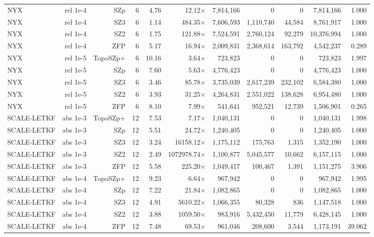 \begin{tabular}{lrrrrrrrrrr}
NYX & rel 1e-4 & SZp & 6 & 4.76 & 12.12$\times$ & 7,814,166 & 0 & 0 & 7,814,166 & 1.000 \\
NYX & rel 1e-4 & SZ3 & 6 & 1.14 & 484.35$\times$ & 7,606,593 & 1,110,740 & 44,584 & 8,761,917 & 1.000 \\
NYX & rel 1e-4 & SZ2 & 6 & 1.75 & 121.88$\times$ & 7,524,591 & 2,760,124 & 92,279 & 10,376,994 & 1.000 \\
NYX & rel 1e-4 & ZFP & 6 & 5.17 & 16.94$\times$ & 2,009,831 & 2,368,614 & 163,792 & 4,542,237 & 0.289 \\
NYX & rel 1e-5 & TopoSZp+ & 6 & 10.16 & 3.64$\times$ & 723,823 & 0 & 0 & 723,823 & 1.997 \\
NYX & rel 1e-5 & SZp & 6 & 7.60 & 5.63$\times$ & 4,776,423 & 0 & 0 & 4,776,423 & 1.000 \\
NYX & rel 1e-5 & SZ3 & 6 & 3.46 & 85.78$\times$ & 3,735,039 & 2,617,239 & 232,102 & 6,584,380 & 1.000 \\
NYX & rel 1e-5 & SZ2 & 6 & 3.93 & 31.25$\times$ & 4,264,831 & 2,551,022 & 138,628 & 6,954,480 & 1.000 \\
NYX & rel 1e-5 & ZFP & 6 & 8.10 & 7.99$\times$ & 541,641 & 952,521 & 12,739 & 1,506,901 & 0.265 \\
SCALE-LETKF & abs 1e-3 & TopoSZp+ & 12 & 7.53 & 7.17$\times$ & 1,040,131 & 0 & 0 & 1,040,131 & 1.998 \\
SCALE-LETKF & abs 1e-3 & SZp & 12 & 5.51 & 24.72$\times$ & 1,240,405 & 0 & 0 & 1,240,405 & 1.000 \\
SCALE-LETKF & abs 1e-3 & SZ3 & 12 & 3.24 & 16158.12$\times$ & 1,175,112 & 175,763 & 1,315 & 1,352,190 & 1.000 \\
SCALE-LETKF & abs 1e-3 & SZ2 & 12 & 2.49 & 1072978.74$\times$ & 1,100,877 & 5,045,577 & 10,662 & 6,157,115 & 1.000 \\
SCALE-LETKF & abs 1e-3 & ZFP & 12 & 5.58 & 225.20$\times$ & 1,049,417 & 100,467 & 1,391 & 1,151,275 & 3.906 \\
SCALE-LETKF & abs 1e-4 & TopoSZp+ & 12 & 9.23 & 6.64$\times$ & 967,942 & 0 & 0 & 967,942 & 1.995 \\
SCALE-LETKF & abs 1e-4 & SZp & 12 & 7.22 & 21.84$\times$ & 1,082,865 & 0 & 0 & 1,082,865 & 1.000 \\
SCALE-LETKF & abs 1e-4 & SZ3 & 12 & 4.91 & 5610.22$\times$ & 1,066,355 & 80,328 & 836 & 1,147,518 & 1.000 \\
SCALE-LETKF & abs 1e-4 & SZ2 & 12 & 3.88 & 1059.50$\times$ & 983,916 & 5,432,450 & 11,779 & 6,428,145 & 1.000 \\
SCALE-LETKF & abs 1e-4 & ZFP & 12 & 7.48 & 69.53$\times$ & 961,046 & 208,600 & 3,544 & 1,173,191 & 39.062 \\

\end{tabular}
